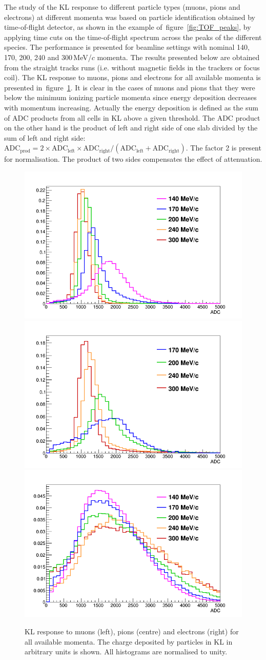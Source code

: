 The study of the KL response to different particle types (muons, pions and electrons) at different momenta was based on particle identification obtained by time-of-flight detector, as shown in the example of~figure~\ref{fig:TOF_peaks}, by applying time cuts on the time-of-flight spectrum across the peaks of the different species. The performance is presented for beamline settings with nominal 140, 170, 200, 240 and 300\,MeV/$c$ momenta. The results presented below are obtained from the straight tracks runs (i.e. without magnetic fields in the trackers or focus coil). The KL response to muons, pions and electrons for all available momenta is presented in~figure~\ref{fig:KL3}. It is clear in the cases of muons and pions that they were below the minimum ionizing particle momenta since energy deposition decreases with momentum increasing. Actually the energy deposition is defined as the sum of ADC products from all cells in KL above a given threshold. The ADC product on the other hand is the product of left and right side of one slab divided by the sum of left and right side: $\text{ADC}_{\text{prod}} = 2 \times \text{ADC}_{\text{left}} \times \text{ADC}_{\text{right}} / (\text{ADC}_{\text{left}} + \text{ADC}_{\text{right}})$. The factor 2 is present for normalisation. The product of two sides compensates the effect of attenuation.
  \begin{figure}
	\begin{center}
  		\includegraphics[width=0.32\columnwidth]{./04-KL/Figures/muon.png}
  		\includegraphics[width=0.32\columnwidth]{./04-KL/Figures/pion.png}
  		\includegraphics[width=0.32\columnwidth]{./04-KL/Figures/electron.png}
  		\caption{KL response to muons (left), pions (centre) and electrons (right) for all available momenta. The charge deposited by particles in KL in arbitrary units is shown. All histograms are normalised to unity.}
  		\label{fig:KL3}
  	\end{center}
  \end{figure}
  
